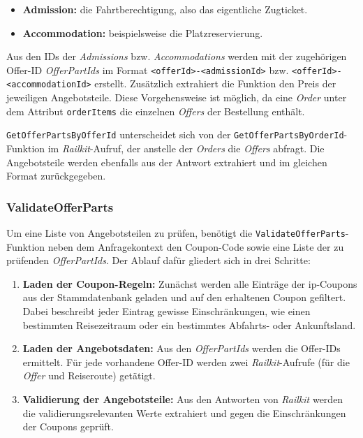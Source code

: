 \begin{itemize}
    \item \textbf{Admission:} die Fahrtberechtigung, also das eigentliche Zugticket.
    \item \textbf{Accommodation:} beispielsweise die Platzreservierung.
\end{itemize}

Aus den IDs der \textit{Admissions} bzw. \textit{Accommodations} werden mit der zugehörigen Offer-ID \textit{OfferPartIds} im Format \texttt{<offerId>-<admissionId>} bzw. \texttt{<offerId>-<accommodationId>} erstellt. Zusätzlich extrahiert die Funktion den Preis der jeweiligen Angebotsteile. Diese Vorgehensweise ist möglich, da eine \textit{Order} unter dem Attribut \texttt{orderItems} die einzelnen \textit{Offers} der Bestellung enthält.

\texttt{GetOfferPartsByOfferId} unterscheidet sich von der \texttt{GetOfferPartsByOrderId}-Funktion im \textit{Railkit}-Aufruf, der anstelle der \textit{Orders} die \textit{Offers} abfragt. Die Angebotsteile werden ebenfalls aus der Antwort extrahiert und im gleichen Format zurückgegeben.

\subsubsection{ValidateOfferParts}
\label{subsubsec:validateofferparts}

Um eine Liste von Angebotsteilen zu prüfen, benötigt die \texttt{ValidateOfferParts}-Funktion neben dem Anfragekontext den Coupon-Code sowie eine Liste der zu prüfenden \textit{OfferPartIds}. Der Ablauf dafür gliedert sich in drei Schritte:

\begin{enumerate}
    \item \textbf{Laden der Coupon-Regeln:} Zunächst werden alle Einträge der \ac{ip}-Coupons aus der Stammdatenbank geladen und auf den erhaltenen Coupon gefiltert. Dabei beschreibt jeder Eintrag gewisse Einschränkungen, wie einen bestimmten Reisezeitraum oder ein bestimmtes Abfahrts- oder Ankunftsland.
    \item \textbf{Laden der Angebotsdaten:} Aus den \textit{OfferPartIds} werden die Offer-IDs ermittelt. Für jede vorhandene Offer-ID werden zwei \textit{Railkit}-Aufrufe (für die \textit{Offer} und Reiseroute) getätigt.
    \item \textbf{Validierung der Angebotsteile:} Aus den Antworten von \textit{Railkit} werden die validierungsrelevanten Werte extrahiert und gegen die Einschränkungen der Coupons geprüft.
\end{enumerate}

